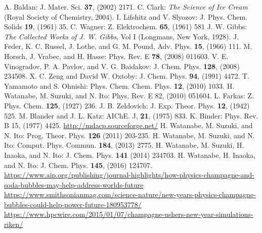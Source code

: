 \documentclass[topics,b5paper,papersize,twocolumn]{jsarticle}
\begin{document}
\begin{thebibliography}{99}
 A. Baldan: J. Mater. Sci. \textbf{37}, (2002) 2171.
 C. Clark: \textit{The Science of Ice Cream} (Royal Society of Chemistry, 2004).
 I. Lifshitz and V. Slyozov: J. Phys. Chem. Solids \textbf{19}, (1961) 35.
 C. Wagner: Z. Elektrochem. \textbf{65}, (1961) 581
 J. W. Gibbs: \textit{The Collected Works of J. W. Gibbs}, Vol I (Longmans, New York, 1928).
 J. Feder, K. C. Russel, J. Lothe, and G. M. Pound, Adv. Phys. \textbf{15}, (1966) 111.
 M. Horsch, J. Vrabec, and H. Hasse: Phys. Rev. E \textbf{78}, (2008) 011603.
 V. E. Vinogradov, P. A. Pavlov, and V. G. Baidakov: J. Chem. Phys. \textbf{128}, (2008) 234508. 
 X. C. Zeng and David W. Oxtoby: J. Chem. Phys. \textbf{94}, (1991) 4472.
 T. Yamamoto and S. Ohnishi: Phys. Chem. Chem. Phys. \textbf{12}, (2010) 1033.
 H. Watanabe, M. Suzuki, and N. Ito: Phys. Rev. E 82, (2010) 051604.
 L. Farkas: Z. Phys. Chem. \textbf{125}, (1927) 236.
 J. B. Zeldovich: J. Exp. Theor. Phys. \textbf{12}, (1942) 525.
 M. Blander and J. L. Katz: AIChE. J, \textbf{21}, (1975) 833.
 K. Binder: Phys. Rev. B 15, (1977) 4425.
 \url{http://mdacp.sourceforge.net/}
 H. Watanabe, M. Suzuki, and N. Ito: Prog. Theor. Phys. \textbf{126} (2011) 203-235.
H. Watanabe, M. Suzuki, and N. Ito: Comput. Phys. Commun. \textbf{184}, (2013) 2775.
 H. Watanabe, M. Suzuki, H. Inaoka, and N. Ito: J. Chem. Phys. \textbf{141} (2014) 234703.
 H. Watanabe, H. Inaoka, and N. Ito: J. Chem. Phys. \textbf{145}, (2016) 124707.
 \url{https://www.aip.org/publishing/journal-highlights/how-physics-champagne-and-soda-bubbles-may-help-address-worlds-future}
 \url{https://www.smithsonianmag.com/science-nature/new-years-physics-champagne-bubbles-could-help-power-future-180953778/}
 \url{https://www.hpcwire.com/2015/01/07/champagne-ushers-new-year-simulations-riken/}
\end{thebibliography}
\end{document}
